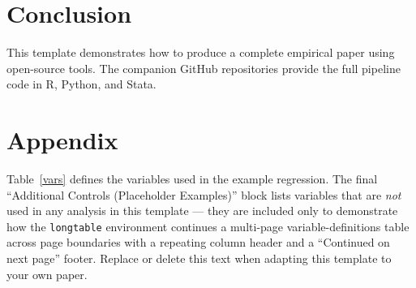 \documentclass[english,12pt]{article}
\begin{document}
\section{Conclusion}\label{section-conclusion}

This template demonstrates how to produce a complete empirical paper using open-source tools. The companion GitHub repositories provide the full pipeline code in R, Python, and Stata.


\newpage
\begin{singlespace}
\printbibliography
\end{singlespace}



\clearpage\newpage
\setcounter{table}{0}
\makeatletter
\renewcommand{\thetable}{A.\arabic{table}}
\setcounter{figure}{0}
\makeatletter
\renewcommand{\thefigure}{A.\arabic{figure}}

\section*{{\large Appendix}} \label{appendix}

\noindent Table~\ref{vars} defines the variables used in the example regression. The final ``Additional Controls (Placeholder Examples)'' block lists variables that are \emph{not} used in any analysis in this template --- they are included only to demonstrate how the \texttt{longtable} environment continues a multi-page variable-definitions table across page boundaries with a repeating column header and a ``Continued on next page'' footer. Replace or delete this text when adapting this template to your own paper.
\end{document}
